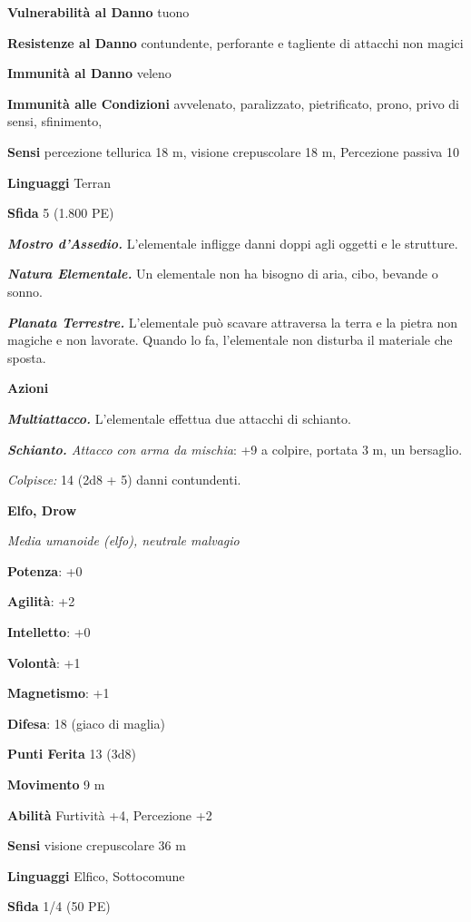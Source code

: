 \begin{multicols}{2}
\textbf{Vulnerabilità al Danno} tuono

\textbf{Resistenze al Danno} contundente, perforante e tagliente di
attacchi non magici

\textbf{Immunità al Danno} veleno

\textbf{Immunità alle Condizioni} avvelenato, paralizzato, pietrificato,
prono, privo di sensi, sfinimento,

\textbf{Sensi} percezione tellurica 18 m, visione crepuscolare 18 m, Percezione
passiva 10

\textbf{Linguaggi} Terran

\textbf{Sfida} 5 (1.800 PE)

\emph{\textbf{Mostro d'Assedio.}} L'elementale infligge danni doppi agli
oggetti e le strutture.

\emph{\textbf{Natura Elementale.}} Un elementale non ha bisogno di aria,
cibo, bevande o sonno.

\emph{\textbf{Planata Terrestre.}} L'elementale può scavare attraversa
la terra e la pietra non magiche e non lavorate. Quando lo fa,
l'elementale non disturba il materiale che sposta.

\textbf{Azioni}

\emph{\textbf{Multiattacco.}} L'elementale effettua due attacchi di
schianto.

\emph{\textbf{Schianto.} Attacco con arma da mischia}: +9 a colpire,
portata 3 m, un bersaglio.

\emph{Colpisce:} 14 (2d8 + 5) danni contundenti.

\textbf{Elfo, Drow}

\emph{Media umanoide (elfo), neutrale malvagio}

\textbf{Potenza}: +0

\textbf{Agilità}: +2

\textbf{Intelletto}: +0

\textbf{Volontà}: +1

\textbf{Magnetismo}: +1

\textbf{Difesa}: 18 (giaco di maglia)

\textbf{Punti Ferita} 13 (3d8)

\textbf{Movimento} 9 m

\textbf{Abilità} Furtività +4, Percezione +2

\textbf{Sensi} visione crepuscolare 36 m

\textbf{Linguaggi} Elfico, Sottocomune

\textbf{Sfida} 1/4 (50 PE)


\end{multicols}
